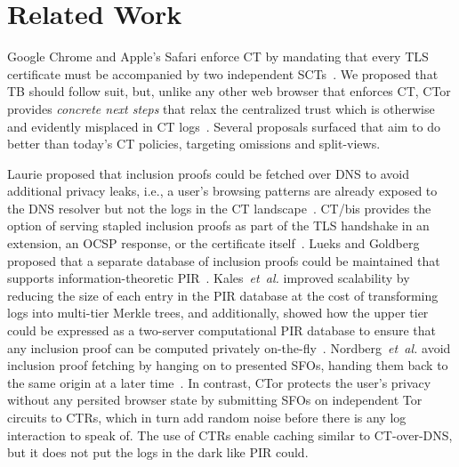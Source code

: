 \section{Related Work} \label{sec:related}
Google Chrome and Apple's Safari enforce CT by mandating that every TLS
certificate must be accompanied by two independent
SCTs~\cite{chrome-policy,safari-policy}.  We proposed that TB should
follow suit, but, unlike any other web browser that enforces CT, CTor provides
\emph{concrete next steps} that relax the centralized trust which is otherwise
and evidently misplaced in CT logs~\cite{%
	izenpe-disqualified,%
	venafi-disqualified,%
	gdca1-omission,%
	digicert-log-compromised%
}.  Several proposals surfaced that aim to do better than today's CT
policies, targeting omissions and split-views.

Laurie proposed that inclusion proofs could be fetched over DNS to avoid
additional privacy leaks, i.e., a user's browsing patterns are already exposed
to the DNS resolver but not the logs in the CT landscape~\cite{ct-over-dns}.
CT/bis provides the option of serving stapled inclusion proofs as part of the
TLS handshake in an extension, an OCSP response, or the certificate
itself~\cite{ct/bis}.
Lueks and Goldberg proposed that a separate database of inclusion proofs could
be maintained that supports information-theoretic PIR~\cite{lueks-and-goldberg}.
Kales~\emph{et~al.} improved scalability by reducing the size of each entry
in the PIR database at the cost of transforming logs into multi-tier Merkle
trees, and additionally, showed how the upper tier could be expressed as
a two-server computational PIR database to ensure that any inclusion proof can
be computed privately on-the-fly~\cite{kales}.
Nordberg~\emph{et~al.} avoid inclusion proof fetching by hanging on to presented
SFOs, handing them back to the same origin at a later time~\cite{nordberg}.
In contrast, CTor protects the user's privacy without any persited browser state
by submitting SFOs on independent Tor circuits to CTRs, which in turn add random
noise before there is any log interaction to speak of.  The use of CTRs
enable caching similar to CT-over-DNS, but it does not put the logs in the dark
like PIR could.

